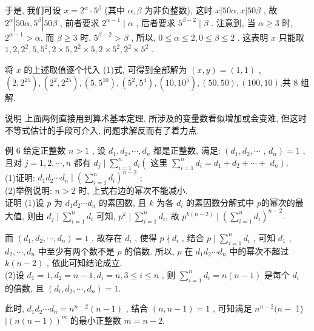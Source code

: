 于是, 我们可设 $x=2^{\alpha} \cdot 5^{\beta}$ (其中 $\alpha ,  \beta$ 为非负整数), 这时 $x|50 \alpha, x| 50 \beta$ , 故 $2^{\alpha}\left|50 \alpha, 5^{\beta}\right| 50 \beta$ , 前者要求 $2^{\alpha-1} \mid \alpha$ , 后者要求 $5^{\beta-2} \mid \beta$ . 注意到, 当 $\alpha \geqslant 3$ 时,  $2^{\alpha-1}>\alpha$, 而 $\beta \geqslant 3$ 时, $5^{\beta-2}>\beta$ , 所以,  $0 \leqslant \alpha \leqslant 2,0 \leqslant \beta \leqslant 2$ . 这表明 $x$ 只能取 $1,2,2^{2}, 5,5^{2}, 2 \times 5,2^{2} \times 5,2 \times 5^{2}, 2^{2} \times 5^{2}$ .

将 $x$ 的上述取值逐个代入 (1)式, 可得到全部解为 $(x, y)=(1,1)$ ,  $\left(2,2^{25}\right),\left(2^{2}, 2^{25}\right),\left(5,5^{10}\right),\left(5^{2}, 5^{4}\right),\left(10,10^{5}\right),(50,50),(100,10)$,共 8 组解.

说明 上面两例直接用到算术基本定理, 所涉及的变量数看似增加或会变难, 但这时不等式估计的手段可介入, 问题求解反而有了着力点.

例 6 给定正整数 $n>1$ , 设 $d_{1}, d_{2}, \cdots, d_{n}$ 都是正整数, 满足:  $\left(d_{1}, d_{2}, \cdots\right.$ ,  $\left.d_{n}\right)=1$ , 且对 $j=1,2, \cdots, n$ 都有 $d_{j} \mid \sum_{i=1}^{n} d_{i}\left(\right.$ 这里 $\sum_{i=1}^{n} d_{i}=d_{1}+d_{2}+\cdots+$ $\left.d_{n}\right)$.\\
(1)证明: $d_{1} d_{2} \cdots d_{n} \mid\left(\sum_{i=1}^{n} d_{i}\right)^{n-2}$ ; \\
(2)举例说明:  $n>2$ 时, 上式右边的幂次不能减小.\\
证明 (1)设 $p$ 为 $d_{1} d_{2} \cdots d_{n}$ 的素因数, 且 $k$ 为各 $d_{i}$ 的素因数分解式中 $p$的幂次的最大值, 则由 $d_{j} \mid \sum_{i=1}^{n} d_{i}$ 可知, $p^{k} \mid \sum_{i=1}^{n} d_{i}$, 故 $p^{k(n-2)} \mid\left(\sum_{i=1}^{n} d_{i}\right)^{n-2}$.

而 $\left(d_{1}, d_{2}, \cdots, d_{n}\right)=1$ , 故存在 $d_{i}$ , 使得 $p \nmid d_{i}$ , 结合 $p \mid \sum_{i=1}^{n} d_{i}$ , 可知 $d_{1}$ ,  $d_{2}, \cdots, d_{n}$ 中至少有两个数不是 $p$ 的倍数. 所以, $p$ 在 $d_{1} d_{2} \cdots d_{n}$ 中的幂次不超过 $k(n-2)$ , 依此可知结论成立. \\
(2)设 $d_{1}=1, d_{2}=n-1, d_{i}=n, 3 \leqslant i \leqslant n$ , 则 $\sum_{i=1}^{n} d_{i}=n(n-1)$ 是每个 $d_{i}$ 的倍数, 且 $\left(d_{i}, d_{2}, \cdots, d_{n}\right)=1$.

此时,  $d_{1} d_{2} \cdots d_{n}=n^{n-2}(n-1)$ , 结合 $(n, n-1)=1$ , 可知满足 $n^{n-2}(n-$ 1) $\mid(n(n-1))^{m}$ 的最小正整数 $m=n-2$.

